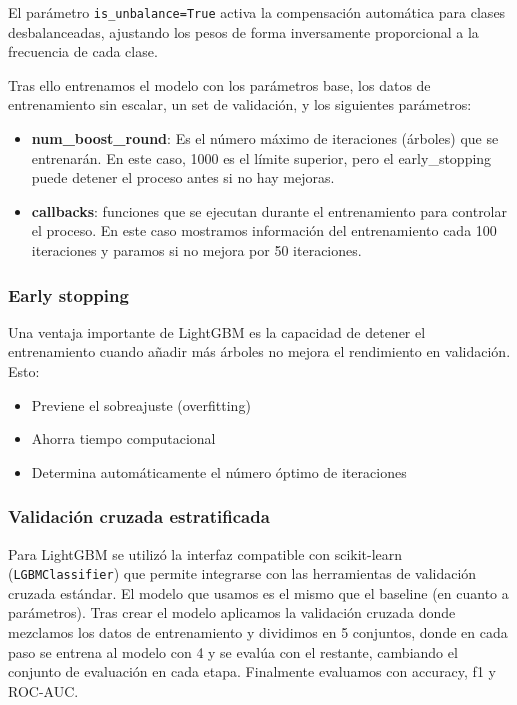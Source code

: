 El parámetro \texttt{is\_unbalance=True} activa la compensación automática para clases desbalanceadas, ajustando los pesos de forma inversamente proporcional a la frecuencia de cada clase. 

Tras ello entrenamos el modelo con los parámetros base, los datos de entrenamiento sin escalar, un set de validación, y los siguientes parámetros:

\begin{itemize}
	\item \textbf{num\_boost\_round}: Es el número máximo de iteraciones (árboles) que se entrenarán. En este caso, 1000 es el límite superior, pero el early\_stopping puede detener el proceso antes si no hay mejoras.
	\item \textbf{callbacks}: funciones que se ejecutan durante el entrenamiento para controlar el proceso. En este caso mostramos información del entrenamiento cada 100 iteraciones y paramos si no mejora por 50 iteraciones.
\end{itemize}

\subsubsection*{Early stopping}
Una ventaja importante de LightGBM es la capacidad de detener el entrenamiento cuando añadir más árboles no mejora el rendimiento en validación. Esto:
\begin{itemize}
    \item Previene el sobreajuste (overfitting)
    \item Ahorra tiempo computacional
    \item Determina automáticamente el número óptimo de iteraciones
\end{itemize}

\subsubsection*{Validación cruzada estratificada}

Para LightGBM se utilizó la interfaz compatible con scikit-learn (\texttt{LGBMClassifier}) que permite integrarse con las herramientas de validación cruzada estándar. El modelo que usamos es el mismo que el baseline (en cuanto a parámetros). Tras crear el modelo aplicamos la validación cruzada donde mezclamos los datos de entrenamiento y dividimos en 5 conjuntos, donde en cada paso se entrena al modelo con 4 y se evalúa con el restante, cambiando el conjunto de evaluación en cada etapa. Finalmente evaluamos con accuracy, f1 y ROC-AUC.  

